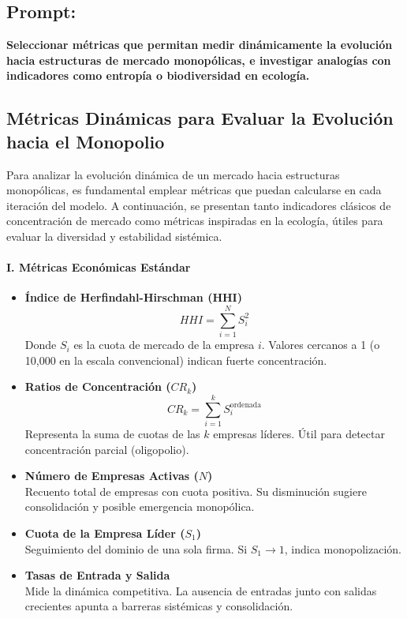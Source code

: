 \documentclass[a4paper,12pt]{article}
\begin{document}
\subsection*{Prompt:}
\textbf{Seleccionar métricas que permitan medir dinámicamente la evolución hacia estructuras de mercado monopólicas, e investigar analogías con indicadores como entropía o biodiversidad en ecología.}

\subsection*{Métricas Dinámicas para Evaluar la Evolución hacia el Monopolio}

Para analizar la evolución dinámica de un mercado hacia estructuras monopólicas, es fundamental emplear métricas que puedan calcularse en cada iteración del modelo. A continuación, se presentan tanto indicadores clásicos de concentración de mercado como métricas inspiradas en la ecología, útiles para evaluar la diversidad y estabilidad sistémica.

\paragraph{I. Métricas Económicas Estándar}

\begin{itemize}
    \item \textbf{Índice de Herfindahl-Hirschman (HHI)}
    \[
    HHI = \sum_{i=1}^{N} S_i^2
    \]
    Donde $S_i$ es la cuota de mercado de la empresa $i$. Valores cercanos a 1 (o 10,000 en la escala convencional) indican fuerte concentración.

    \item \textbf{Ratios de Concentración ($CR_k$)}
    \[
    CR_k = \sum_{i=1}^{k} S_i^{\text{ordenada}}
    \]
    Representa la suma de cuotas de las $k$ empresas líderes. Útil para detectar concentración parcial (oligopolio).

    \item \textbf{Número de Empresas Activas ($N$)}\\
    Recuento total de empresas con cuota positiva. Su disminución sugiere consolidación y posible emergencia monopólica.

    \item \textbf{Cuota de la Empresa Líder ($S_1$)}\\
    Seguimiento del dominio de una sola firma. Si $S_1 \rightarrow 1$, indica monopolización.

    \item \textbf{Tasas de Entrada y Salida}\\
    Mide la dinámica competitiva. La ausencia de entradas junto con salidas crecientes apunta a barreras sistémicas y consolidación.
\end{itemize}
\end{document}

